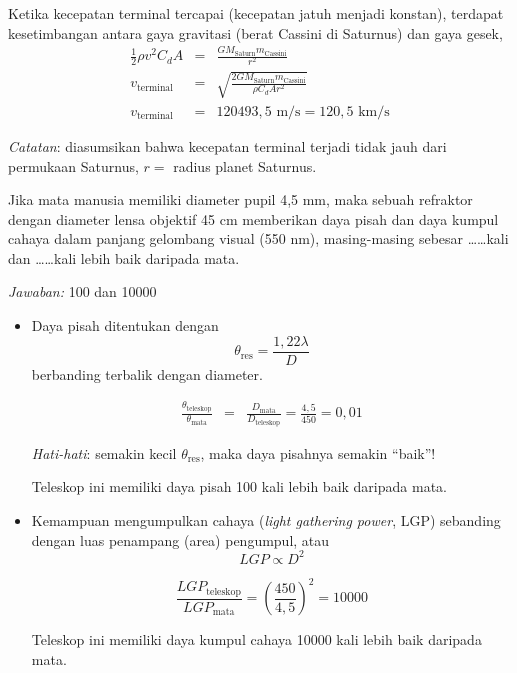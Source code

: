 \documentclass[11pt,fleqn]{exam}
\begin{document}
\begin{questions}
Ketika kecepatan terminal tercapai (kecepatan jatuh menjadi konstan), terdapat kesetimbangan antara gaya gravitasi (berat Cassini di Saturnus) dan gaya gesek,
\begin{eqnarray*}
\frac{1}{2} \rho v^2 C_d A &=& \frac{GM_\text{Saturn} m_\text{Cassini}}{r^2}\\
v_\text{terminal} &=&  \sqrt{\frac{2 GM_\text{Saturn} m_\text{Cassini}}{\rho C_d A r^2}}\\
v_\text{terminal} &=& 120493,5 \text{ m/s} = 120,5 \text{ km/s}
\end{eqnarray*}

\textit{Catatan}: diasumsikan bahwa kecepatan terminal terjadi tidak jauh dari permukaan Saturnus, $r =$ radius planet Saturnus.





\question Jika mata manusia memiliki diameter pupil 4,5 mm, maka sebuah refraktor dengan diameter lensa objektif 45 cm memberikan daya pisah dan daya kumpul cahaya dalam panjang gelombang visual (550 nm), masing-masing sebesar \ldots\ldots  kali dan \ldots\ldots kali lebih baik daripada mata.

\textit{Jawaban: } 100 dan 10000
\begin{itemize}
\item Daya pisah ditentukan dengan
$$\theta_{\text{res}} = \frac{1,22 \lambda}{D}$$
berbanding terbalik dengan diameter.

\begin{eqnarray*}
\frac{\theta_\text{teleskop}}{\theta_\text{mata}} &=& \frac{D_\text{mata}}{D_\text{teleskop}} = \frac{4,5}{450} = 0,01
\end{eqnarray*}

\textit{Hati-hati}: semakin kecil $\theta_{\text{res}}$, maka daya pisahnya semakin ``baik''!

Teleskop ini memiliki daya pisah 100 kali lebih baik daripada mata.


\item Kemampuan mengumpulkan cahaya (\textit{light gathering power}, LGP) sebanding dengan luas penampang (area) pengumpul, atau
$$LGP \propto D^2$$

$$\frac{LGP_\text{teleskop}}{LGP_\text{mata}} = \left( \frac{450}{4,5} \right)^2 = 10000$$

Teleskop ini memiliki daya kumpul cahaya 10000 kali lebih baik daripada mata.

\end{itemize}





\end{questions}
\end{document}
